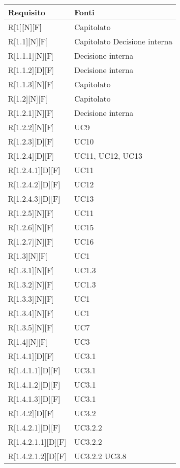 
\begin{longtable}{X | X}  
			\rowcolor{orange!85}Requisito & Fonti \\
\endhead
R[1][N][F] & Capitolato \\
\hline
R[1.1][N][F] & Capitolato \newline Decisione interna \\
\hline
R[1.1.1][N][F] & Decisione interna \\
\hline
R[1.1.2][D][F] & Decisione interna \\
\hline
R[1.1.3][N][F] & Capitolato \\
\hline
R[1.2][N][F] & Capitolato \\
\hline
R[1.2.1][N][F] & Decisione interna \\
\hline
R[1.2.2][N][F] & UC9 \\
\hline
R[1.2.3][D][F] & UC10 \\
\hline
R[1.2.4][D][F] & UC11, UC12, UC13 \\
\hline
R[1.2.4.1][D][F] & UC11 \\
\hline
R[1.2.4.2][D][F] & UC12 \\
\hline
R[1.2.4.3][D][F] & UC13 \\
\hline
R[1.2.5][N][F] & UC11 \\
\hline
R[1.2.6][N][F] & UC15 \\
\hline
R[1.2.7][N][F] & UC16 \\
\hline
R[1.3][N][F] & UC1 \\
\hline
R[1.3.1][N][F] & UC1.3 \\
\hline
R[1.3.2][N][F] & UC1.3 \\
\hline
R[1.3.3][N][F] & UC1 \\
\hline
R[1.3.4][N][F] & UC1 \\
\hline
R[1.3.5][N][F] & UC7 \\
\hline
R[1.4][N][F] & UC3 \\
\hline
R[1.4.1][D][F] & UC3.1 \\
\hline
R[1.4.1.1][D][F] & UC3.1 \\
\hline
R[1.4.1.2][D][F] & UC3.1 \\
\hline
R[1.4.1.3][D][F] & UC3.1 \\
\hline
R[1.4.2][D][F] & UC3.2 \\
\hline
R[1.4.2.1][D][F] & UC3.2.2 \\
\hline
R[1.4.2.1.1][D][F] & UC3.2.2 \\
\hline
R[1.4.2.1.2][D][F] & UC3.2.2 \newline UC3.8 \\

\end{longtable}
